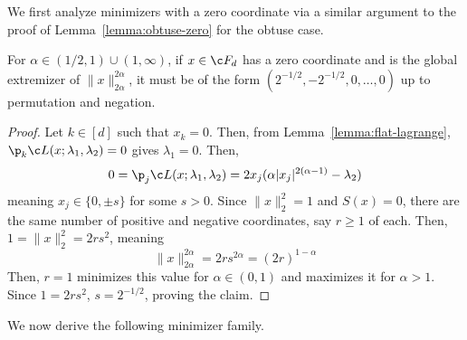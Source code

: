 \documentclass[11pt]{article}
\begin{document}
We first analyze minimizers with a zero coordinate via a similar argument to the proof of Lemma~\ref{lemma:obtuse-zero} for the obtuse case. 
\begin{lemma}\label{lemma:flat-zero}
    For $\alpha \in (1/2,1)\cup (1,\infty)$, if $x\in \c F_{d}$ has a zero coordinate and is the global extremizer of $\|x\|_{2\alpha}^{2\alpha}$, it must be of the form $(2^{-1/2},-2^{-1/2},0,\dots,0)$ up to permutation and negation. 
\end{lemma}
\begin{proof}
    Let $k\in [d]$ such that $x_k=0$. Then, from Lemma~\ref{lemma:flat-lagrange}, $\p_k \c L(x;\lambda_1,\lambda_2)=0$ gives $\lambda_1=0$. Then, 
    \begin{equation}
        0=\p_j \c L(x;\lambda_1,\lambda_2)=2x_j(\alpha |x_j|^{2(\alpha-1)}-\lambda_2)
    \end{equation}
    meaning $x_j\in\{0,\pm s\}$ for some $s>0$. Since $\|x\|_2^2=1$ and $S(x)=0$, there are the same number of positive and negative coordinates, say $r\geq 1$ of each. Then, $1=\|x\|_2^2=2rs^2$, meaning
    \begin{equation}
        \|x\|_{2\alpha}^{2\alpha}=2r s^{2\alpha}=(2r)^{1-\alpha}
    \end{equation}
    Then, $r=1$ minimizes this value for $\alpha \in (0,1)$ and maximizes it for $\alpha >1$. Since $1=2rs^2$, $s= 2^{-1/2}$, proving the claim.
\end{proof}

We now derive the following minimizer family.  
\end{document}
